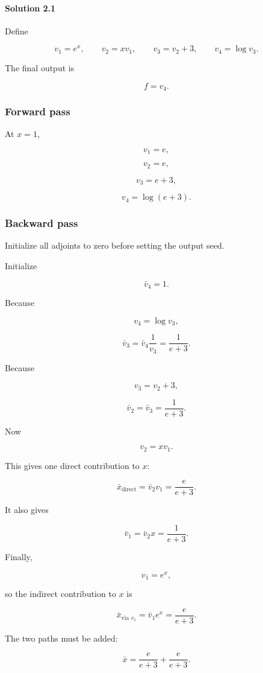 \documentclass[10pt]{article}
\begin{document}
\begingroup\color{red}
\paragraph*{Solution 2.1}
Define

\[
v_1=e^x,
\qquad
v_2=xv_1,
\qquad
v_3=v_2+3,
\qquad
v_4=\log v_3.
\]

The final output is

\[
f=v_4.
\]

\subsubsection*{Forward pass}
At $x=1$,

\[
v_1=e,
\]

\[
v_2=e,
\]

\[
v_3=e+3,
\]

\[
v_4=\log(e+3).
\]

\subsubsection*{Backward pass}
Initialize all adjoints to zero before setting the output seed.

Initialize

\[
\bar v_4=1.
\]

Because

\[
v_4=\log v_3,
\]

\[
\bar v_3
=
\bar v_4\frac{1}{v_3}
=
\frac{1}{e+3}.
\]

Because

\[
v_3=v_2+3,
\]

\[
\bar v_2
=
\bar v_3
=
\frac{1}{e+3}.
\]

Now

\[
v_2=xv_1.
\]

This gives one direct contribution to $x$:

\[
\bar x_{\text{direct}}
=
\bar v_2 v_1
=
\frac{e}{e+3}.
\]

It also gives

\[
\bar v_1
=
\bar v_2 x
=
\frac{1}{e+3}.
\]

Finally,

\[
v_1=e^x,
\]

so the indirect contribution to $x$ is

\[
\bar x_{\text{via }v_1}
=
\bar v_1 e^x
=
\frac{e}{e+3}.
\]

The two paths must be added:

\[
\bar x
=
\frac{e}{e+3}
+
\frac{e}{e+3}.
\]
\end{document}
